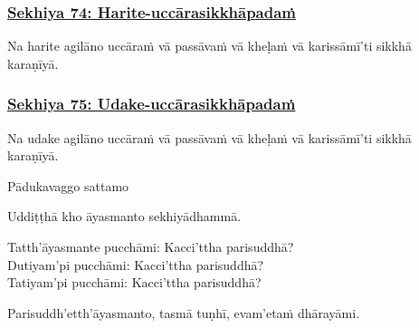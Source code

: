 \subsubsection*{\hyperref[training74]{Sekhiya 74: Harite-uccārasikkhāpadaṁ}}
\label{sekh74}

Na harite agilāno uccāraṁ vā passāvaṁ vā kheḷaṁ vā karissāmī'ti sikkhā karaṇīyā.



\subsubsection*{\hyperref[training75]{Sekhiya 75: Udake-uccārasikkhāpadaṁ}}
\label{sekh75}

Na udake agilāno uccāraṁ vā passāvaṁ vā kheḷaṁ vā karissāmī'ti sikkhā karaṇīyā.

\begin{center}
	Pādukavaggo sattamo\makeatletter\hyperlink{endnote525-appendix}\makeatother \thinspace
\end{center}



\medskip

\begin{center}
	Uddiṭṭhā kho āyasmanto sekhiyā\makeatletter\hyperlink{endnote526-appendix}\makeatother \thinspace dhammā.

	\smallskip

	Tatth'āyasmante pucchāmi: Kacci'ttha parisuddhā?\\
	Dutiyam'pi pucchāmi: Kacci'ttha parisuddhā?\\
	Tatiyam'pi pucchāmi: Kacci'ttha parisuddhā?

	\smallskip

	Parisuddh'etth'āyasmanto, tasmā tuṇhī, evam'etaṁ dhārayāmi.\makeatletter\hyperlink{endnote527-appendix}\makeatother \thinspace
\end{center}

